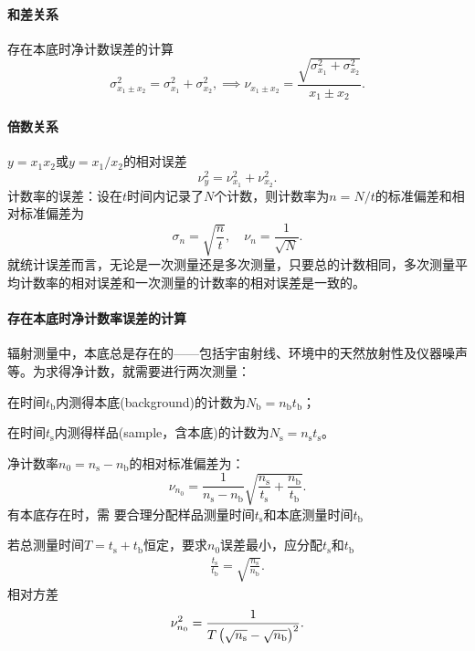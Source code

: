 \paragraph{和差关系}存在本底时净计数误差的计算
\[
	\sigma_{x_1\pm x_2}^2=\sigma_{x_1}^2+\sigma_{x_2}^2,\implies\nu_{x_1\pm x_2}=\frac{\sqrt{\sigma_{x_1}^2+\sigma_{x_2}^2}}{x_1\pm x_2}.
\]

\paragraph{倍数关系}$y=x_1x_2$或$y=x_1/x_2$的相对误差
\[
	\nu_y^2=\nu_{x_1}^2+\nu_{x_2}^2.
\]
计数率的误差：设在$t$时间内记录了$N$个计数，则计数率为$n=N/t$的标准偏差和相对标准偏差为
\[
	\sigma_n=\sqrt{\frac nt},\quad\nu_n=\frac1{\sqrt N}.
\]
就统计误差而言，无论是一次测量还是多次测量，只要总的计数相同，多次测量平均计数率的相对误差和一次测量的计数率的相对误差是一致的。
\paragraph{存在本底时净计数率误差的计算}辐射测量中，本底总是存在的——包括宇宙射线、环境中的天然放射性及仪器噪声等。为求得净计数，就需要进行两次测量：
\begin{compactitem}
	\item 在时间$t_\mathrm b$内测得本底(background)的计数为$N_\mathrm b=n_\mathrm bt_\mathrm b$；
	\item 在时间$t_\mathrm s$内测得样品(sample，含本底)的计数为$N_\mathrm s=n_\mathrm st_\mathrm s$。
\end{compactitem}
净计数率$n_0=n_\mathrm s-n_\mathrm b$的相对标准偏差为：
\[
	\nu_{n_0}=\frac1{n_\mathrm s-n_\mathrm b}\sqrt{\frac{n_\mathrm s}{t_\mathrm s}+\frac{n_\mathrm b}{t_\mathrm b}}.
\]
有本底存在时，需 要合理分配样品测量时间$t_\mathrm s$和本底测量时间$t_\mathrm b$

若总测量时间$T=t_\mathrm s+t_\mathrm b$恒定，要求$n_0$误差最小，应分配$t_\mathrm s$和$t_\mathrm b$
\begin{align}
	\frac{t_\mathrm s}{t_\mathrm b}=\sqrt{\frac{n_\mathrm s}{n_\mathrm b}}.
\end{align}
相对方差
\begin{align}
	\nu_{n_0}^2=\frac1{T\left(\sqrt{n_\mathrm s}-\sqrt{n_\mathrm b}\right)^2}.
\end{align}

